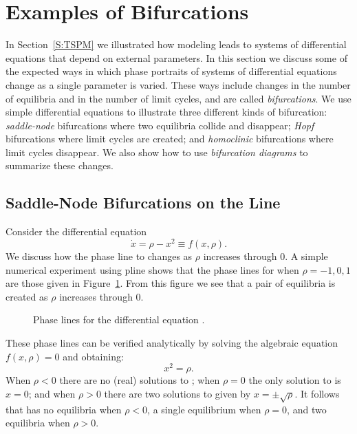 \section{Examples of Bifurcations}
\label{S:bifurcation} 

In Section~\ref{S:TSPM} we illustrated how modeling leads to systems 
of differential equations that depend on external parameters.  In this 
section we discuss some of the expected ways in which phase portraits of 
systems of differential equations change as a single parameter is varied.  
These ways include changes in the number of equilibria and in the number 
of limit cycles, and are called {\em bifurcations\/}.   We use simple 
differential equations to illustrate three different kinds of bifurcation: 
{\em saddle-node\/} bifurcations where two equilibria collide and disappear; 
{\em Hopf\/} bifurcations where limit cycles are created; and 
{\em homoclinic\/} bifurcations where limit cycles disappear.  We also show 
how to use {\em bifurcation diagrams\/} to summarize these changes.

\subsection*{Saddle-Node Bifurcations on the Line}

Consider the differential equation
\begin{equation}  \label{E:sbif}
\dot{x} = \rho - x^2 \equiv f(x,\rho).
\end{equation}
We discuss how the phase line to  changes as $\rho$ increases 
through $0$.  A simple numerical experiment using {\sf pline} shows that
the phase lines for  when $\rho=-1,0,1$ are those given in 
Figure~\ref{F:sbif}.  From this figure we see that a pair of equilibria 
is created as $\rho$ increases through $0$.

\vspace{0.4in}

\begin{figure}[htb]
           \centerline{%
           }
           \caption{Phase lines for the differential equation 
    		\protect{}.}
           \label{F:sbif}
\end{figure}


These phase lines can be verified analytically by solving the 
algebraic equation $f(x,\rho)=0$ and obtaining:
\begin{equation} \label{E:sbife}
x^2 = \rho.
\end{equation}
When $\rho<0$ there are no (real) solutions to ; when
$\rho=0$ the only solution to  is $x=0$; and when $\rho>0$
there are two solutions to  given by $x=\pm\sqrt{\rho}$.
It follows that  has no equilibria when $\rho<0$, a single
equilibrium when $\rho=0$, and two equilibria when $\rho>0$.

